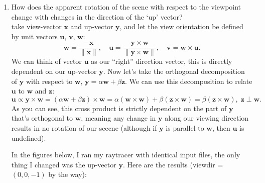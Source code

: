 \documentclass{assignment}
\date{\today}
\newcommand{\n}{\vspace{0.2cm}}
\def\u{\mathbf u}
\def\v{\mathbf v}
\def\w{\mathbf w}
\def\x{\mathbf x}
\def\y{\mathbf y}
\def\z{\mathbf z}
\begin{document}
\begin{enumerate}
 \item How does the apparent rotation of the scene with respect to the viewpoint change with changes in the direction of the `up’ vector? \n\\
       take view-vector \(\x\) and up-vector \(\y\), and let the view orientation be defined by unit vectors \(\u\), \(\v\), \(\w\):
       \[\w = \frac{-\x}{\lVert \x \rVert}, \quad \u = \frac{\y \times \w}{\lVert \y \times \w \rVert}, \quad \v = \w \times \u.\]
       We can think of vector \(\u\) as our ``right'' direction vector, this is directly dependent on our up-vector \(\y\).  Now let's take the orthogonal decomposition of \(\y\) with respect to \(\w\), \(\y = \alpha \w + \beta \z\).  We can use this decomposition to relate \(\u\) to \(\w\) and \(\z\):
       \[\u \propto  \y \times \w = (\alpha \w + \beta \z) \times \w = \alpha (\w \times \w) + \beta (\z \times \w) = \beta (\z \times \w), \; \z \perp \w.\]
       As you can see, this cross product is strictly dependent on the part of \(\y\) that's orthogonal to \(\w\), meaning any change in \(\y\) along our viewing direction results in no rotation of our scecne (although if \(\y\) is parallel to \(\w\), then \(\u\) is undefined).

       In the figures below, I ran my raytracer with identical input files, the only thing I changed was the up-vector \(\y\).  Here are the results (viewdir = \((0,0,-1)\) by the way):


\end{enumerate}
\end{document}
